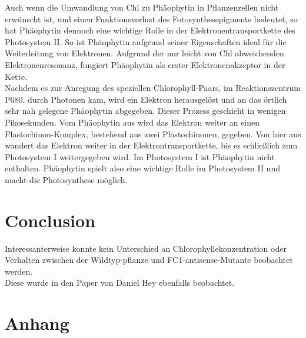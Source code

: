 \documentclass[10pt,a4paper]{article}
\begin{document}
			Auch wenn die Umwandlung von Chl zu Phäophytin in Pflanzenzellen nicht erwünscht ist, und einen Funktionsverlust des Fotosynthesepigments bedeutet, so hat Phäophytin dennoch eine wichtige Rolle in der Elektronentransportkette des Photosystem II. So ist Phäophytin aufgrund seiner Eigenschaften ideal für die Weiterleitung von Elektronen. Aufgrund der nur leicht von Chl abweichenden Elektronenresonanz, fungiert Phäophytin als erster Elektronenakzeptor in der Kette.\\ Nachdem es zur Anregung des speziellen Chlorophyll-Paars, im Reaktionszentrum P680, durch Photonen kam, wird ein Elektron herausgelöst und an das örtlich sehr nah gelegene Phäophytin abgegeben. Dieser Prozess geschieht in wenigen Pikosekunden. Vom Phäophytin aus wird das Elektron weiter an einen Plastochinon-Komplex, bestehend aus zwei Plastochinonen, gegeben. Von hier aus wandert das Elektron weiter in der Elektrontransportkette, bis es schließlich zum Photosystem I weitergegeben wird. Im Photosystem I ist Phäophytin nicht enthalten\cite{Photosystem_phäopytin}. Phäophytin spielt also eine wichtige Rolle im Photosystem II und macht die Photosynthese möglich.\\
	
	\section{Conclusion}
	
	Interessanterweise konnte kein Unterschied an Chlorophyllekonzentration oder Verhalten zwischen der Wildtyp-pflanze und FC1-antisense-Mutante beobachtet werden.\\
	Diese wurde in den Paper von Daniel Hey \cite{FC1_Paper} ebenfalls beobachtet.
	
	\section{Anhang}
\end{document}
